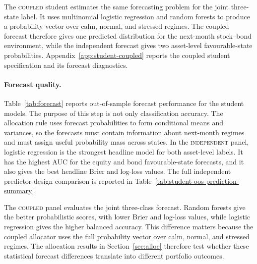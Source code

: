 \documentclass[10pt]{article}
\newcommand{\Acoup}{\textsc{coupled}}
\newcommand{\Bindep}{\textsc{independent}}
\begin{document}
The \Acoup{} student estimates the same forecasting problem for the joint three-state label.
It uses multinomial logistic regression and random forests to produce a probability vector
over calm, normal, and stressed regimes. The coupled forecast therefore gives one predicted
distribution for the next-month stock--bond environment, while the independent forecast gives
two asset-level favourable-state probabilities. Appendix~\ref{app:student-coupled} reports
the coupled student specification and its forecast diagnostics.

\paragraph{Forecast quality.}
Table~\ref{tab:forecast} reports out-of-sample forecast performance for the student models.
The purpose of this step is not only classification accuracy. The allocation rule uses
forecast probabilities to form conditional means and variances, so the forecasts must contain
information about next-month regimes and must assign useful probability mass across states.
In the \Bindep{} panel, logistic regression is the strongest headline model for both
asset-level labels. It has the highest AUC for the equity and bond favourable-state
forecasts, and it also gives the best headline Brier and log-loss values. The full
independent predictor-design comparison is reported in
Table~\ref{tab:student-oos-prediction-summary}.

The \Acoup{} panel evaluates the joint three-class forecast. Random forests give the better
probabilistic scores, with lower Brier and log-loss values, while logistic regression gives
the higher balanced accuracy. This difference matters because the coupled allocator uses the
full probability vector over calm, normal, and stressed regimes. The allocation results in
Section~\ref{sec:alloc} therefore test whether these statistical forecast differences
translate into different portfolio outcomes.
\end{document}
